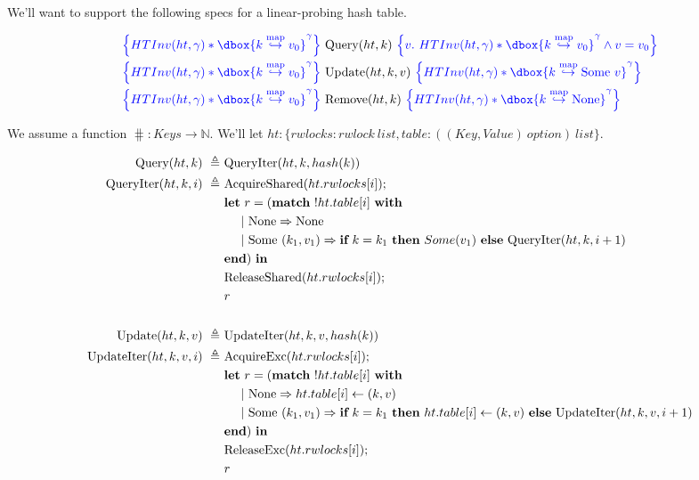 \documentclass{article}
\newcommand\dboxed[1]{\dbox{\vphantom{t}\ensuremath{#1}}}
\renewcommand{\eqdef}{\triangleq}
\begin{document}
We'll want to support the following specs for a linear-probing hash table.

\begin{align*}
\inlinehoare{\HTInv(ht,\gamma) * \dboxed{k \hashto v_0}^\gamma} &~ \Query(ht,k) ~ \inlinehoare{v.~ \HTInv(ht,\gamma) * \dboxed{k \hashto v_0}^\gamma \land v = v_0}\\
\inlinehoare{\HTInv(ht,\gamma) * \dboxed{k \hashto v_0}^\gamma} &~ \Update(ht,k, v) ~ \inlinehoare{\HTInv(ht,\gamma) * \dboxed{k \hashto \Some~v}^\gamma}\\
\inlinehoare{\HTInv(ht,\gamma) * \dboxed{k \hashto v_0}^\gamma} &~ \Remove(ht,k) ~ \inlinehoare{\HTInv(ht,\gamma) * \dboxed{k \hashto \None}^\gamma}
\end{align*}

We assume a function $\hash : Keys \to \mathbb{N}$. We'll let $ht : \{rwlocks: rwlock~list, table: ((Key,Value)~option)~list\}$.

\begin{align*}
  \Query(ht,k) ~\eqdef~ & \QueryIter(ht,k,\hash(k))\\
  \QueryIter(ht,k,i) ~\eqdef~ & 
      \AcquireShared(ht.rwlocks[i]);\\
      &\langlet r = (\langmatch~ !ht.table[i] ~\langwith\\
      &~~~~ |~ \None \Rightarrow \None\\
      &~~~~ |~ \Some~(k_1,v_1) \Rightarrow
          \langif~ k = k_1 ~\langthen~ Some(v_1) ~\langelse~ \QueryIter(ht,k,i+1)\\
      &\langend) ~\langin\\
      &\ReleaseShared(ht.rwlocks[i]);\\
      &r\\
      \\
  \Update(ht,k,v) ~\eqdef~ & \UpdateIter(ht,k,v,\hash(k))\\
  \UpdateIter(ht,k,v,i) ~\eqdef~ & 
      \AcquireExc(ht.rwlocks[i]);\\
      &\langlet r = (\langmatch~ !ht.table[i] ~\langwith\\
      &~~~~ |~ \None \Rightarrow ht.table[i] \langassign (k,v)\\
      &~~~~ |~ \Some~(k_1,v_1) \Rightarrow
          \langif~ k = k_1 ~\langthen~ ht.table[i] \langassign (k,v) ~\langelse~ \UpdateIter(ht,k,v,i+1)\\
      &\langend) ~\langin\\
      &\ReleaseExc(ht.rwlocks[i]);\\
      &r
\end{align*}
\end{document}
